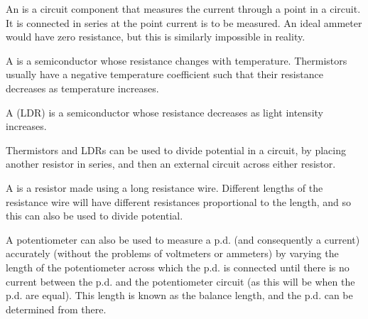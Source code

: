 \documentclass[Physics.tex]{subfiles}
\begin{document}
An  is a circuit component that measures the current through a point in a circuit. It is connected in series at the point current is to be measured. An ideal ammeter would have zero resistance, but this is similarly impossible in reality.

A  is a semiconductor whose resistance changes with temperature. Thermistors usually have a negative temperature coefficient such that their resistance decreases as temperature increases.

A  (LDR) is a semiconductor whose resistance decreases as light intensity increases.

Thermistors and LDRs can be used to divide potential in a circuit, by placing another resistor in series, and then an external circuit across either resistor.

A  is a resistor made using a long resistance wire. Different lengths of the resistance wire will have different resistances proportional to the length, and so this can also be used to divide potential.

A potentiometer can also be used to measure a p.d. (and consequently a current) accurately (without the problems of voltmeters or ammeters) by varying the length of the potentiometer across which the p.d. is connected until there is no current between the p.d. and the potentiometer circuit (as this will be when the p.d. are equal). This length is known as the balance length, and the p.d. can be determined from there.
\end{document}
